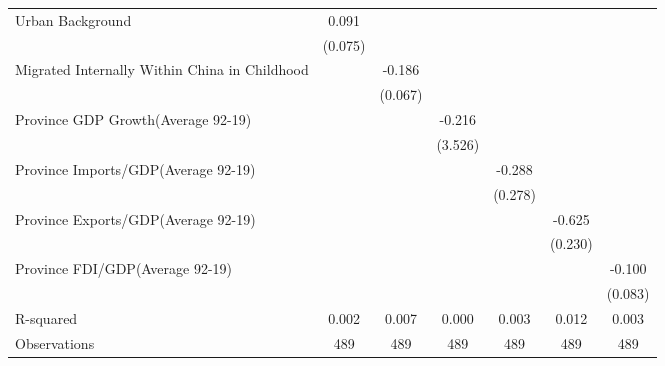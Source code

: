 \begin{table}
\begin{adjustbox}{width=\columnwidth,center}
\begin{tabular}{l*{6}{c}}
Urban Background &    0.091&         &         &         &         &         \\
                &  (0.075)&         &         &         &         &         \\
[1em]
Migrated Internally Within China in Childhood       &         &   -0.186&         &         &         &         \\
                &         &  (0.067)&         &         &         &         \\
[1em]
Province GDP Growth(Average 92-19)&         &         &   -0.216&         &         &         \\
                &         &         &  (3.526)&         &         &         \\
[1em]
Province Imports/GDP(Average 92-19)&         &         &         &   -0.288&         &         \\
                &         &         &         &  (0.278)&         &         \\
[1em]
Province Exports/GDP(Average 92-19)&         &         &         &         &   -0.625&         \\
                &         &         &         &         &  (0.230)&         \\
[1em]
Province FDI/GDP(Average 92-19)&         &         &         &         &         &   -0.100\\
                &         &         &         &         &         &  (0.083)\\
R-squared       &    0.002&    0.007&    0.000&    0.003&    0.012&    0.003\\
\hline
Observations    &  489&  489&  489&  489&  489&  489\\
        \hline\hline        
\end{tabular}  
\end{adjustbox}
\\
\begin{adjustwidth}{-1cm}{-1cm}             
    \begin{scriptsize}       

\end{scriptsize}
\end{adjustwidth}
\end{table}
